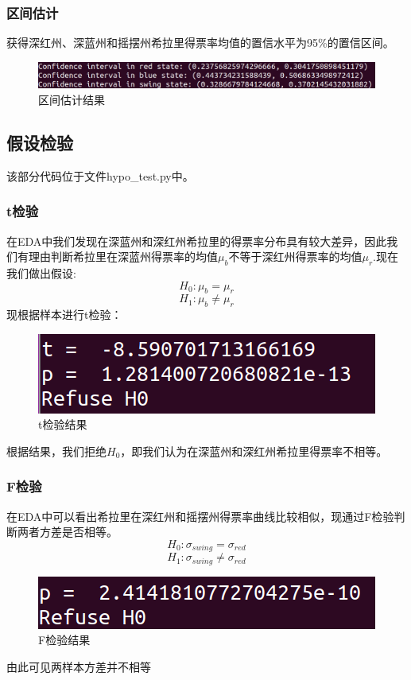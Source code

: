 \documentclass[
12pt, %
UTF8
]{fphw}
\begin{document}
		\subsubsection{区间估计}
		获得深红州、深蓝州和摇摆州希拉里得票率均值的置信水平为95\%的置信区间。
		\begin{figure}[H]
			\centering
			\includegraphics[scale=0.45]{inter.png}
			\caption{区间估计结果}
		\end{figure}
	
	\subsection{假设检验}
	该部分代码位于文件hypo\_test.py中。
		\subsubsection{t检验}
		在EDA中我们发现在深蓝州和深红州希拉里的得票率分布具有较大差异，因此我们有理由判断希拉里在深蓝州得票率的均值$\mu_b$不等于深红州得票率的均值$\mu_r$.现在我们做出假设:
		$$H_0: \mu_b = \mu_r$$
		$$H_1: \mu_b \ne \mu_r$$
		现根据样本进行t检验：
		\begin{figure}[H]
			\centering
			\includegraphics[scale=0.45]{hypo.png}
			\caption{t检验结果}
		\end{figure}
	    根据结果，我们拒绝$H_0$，即我们认为在深蓝州和深红州希拉里得票率不相等。
		\subsubsection{F检验}
		在EDA中可以看出希拉里在深红州和摇摆州得票率曲线比较相似，现通过F检验判断两者方差是否相等。
		$$H_0: \sigma_{swing} = \sigma_{red}$$
		$$H_1: \sigma_{swing} \ne \sigma_{red}$$
		\begin{figure}[H]
			\centering
			\includegraphics[scale=0.5]{F.png}
			\caption{F检验结果}
		\end{figure}
		由此可见两样本方差并不相等
\end{document}
